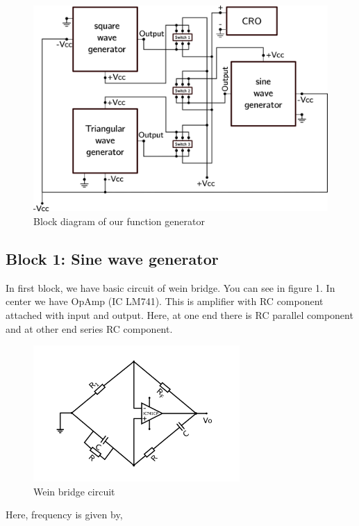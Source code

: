 \documentclass[14pt,a4paper]{extarticle}
\begin{document}
\begin{figure}[htbp]
\centering
\includegraphics[width=.95\textwidth]{imgs/blocks.png}
\caption{\label{fig:org0f0169c}Block diagram of our function generator}
\end{figure}


\subsection{Block 1: Sine wave generator}
\label{sec:org4b2de51}


In first block, we have basic circuit of wein bridge. You can see in figure 1. In center we have OpAmp (IC LM741). This is amplifier with RC component attached with input and output. Here, at one end there is RC parallel component and at other end series RC component. 


\begin{figure}[ht]
    \centering
    \label{sine}
    \includegraphics[width=0.7\textwidth]{imgs/sine.png}
    \caption{Wein bridge circuit}
\end{figure}

Here, frequency is given by, 
\end{document}
